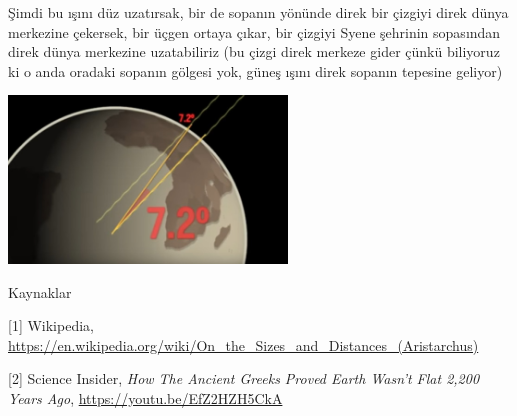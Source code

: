 \documentclass[12pt,fleqn]{article}\usepackage{../../common}
\begin{document}
Şimdi bu ışını düz uzatırsak, bir de sopanın yönünde direk bir çizgiyi direk
dünya merkezine çekersek, bir üçgen ortaya çıkar, bir çizgiyi Syene şehrinin
sopasından direk dünya merkezine uzatabiliriz (bu çizgi direk merkeze gider
çünkü biliyoruz ki o anda oradaki sopanın gölgesi yok, güneş ışını direk sopanın
tepesine geliyor)

\includegraphics[width=20em]{circum2.jpg}



Kaynaklar

[1] Wikipedia,
    \url{https://en.wikipedia.org/wiki/On_the_Sizes_and_Distances_(Aristarchus)}

[2] Science Insider, {\em How The Ancient Greeks Proved Earth Wasn't Flat 2,200 Years Ago},
    \url{https://youtu.be/EfZ2HZH5CkA}
    
\end{document}
